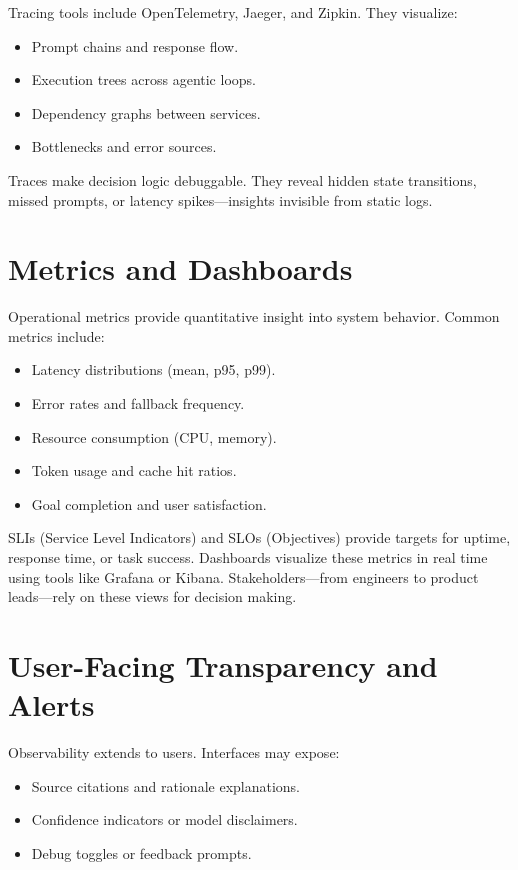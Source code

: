 \documentclass{book}
\begin{document}
Tracing tools include OpenTelemetry, Jaeger, and Zipkin. They visualize:

\begin{itemize}
  \item Prompt chains and response flow.
  \item Execution trees across agentic loops.
  \item Dependency graphs between services.
  \item Bottlenecks and error sources.
\end{itemize}

Traces make decision logic debuggable. They reveal hidden state transitions, missed prompts, or latency spikes—insights invisible from static logs.

\section{Metrics and Dashboards}

Operational metrics provide quantitative insight into system behavior. Common metrics include:

\begin{itemize}
  \item Latency distributions (mean, p95, p99).
  \item Error rates and fallback frequency.
  \item Resource consumption (CPU, memory).
  \item Token usage and cache hit ratios.
  \item Goal completion and user satisfaction.
\end{itemize}

SLIs (Service Level Indicators) and SLOs (Objectives) provide targets for uptime, response time, or task success. Dashboards visualize these metrics in real time using tools like Grafana or Kibana. Stakeholders—from engineers to product leads—rely on these views for decision making.

\section{User-Facing Transparency and Alerts}

Observability extends to users. Interfaces may expose:

\begin{itemize}
  \item Source citations and rationale explanations.
  \item Confidence indicators or model disclaimers.
  \item Debug toggles or feedback prompts.
\end{itemize}
\end{document}
